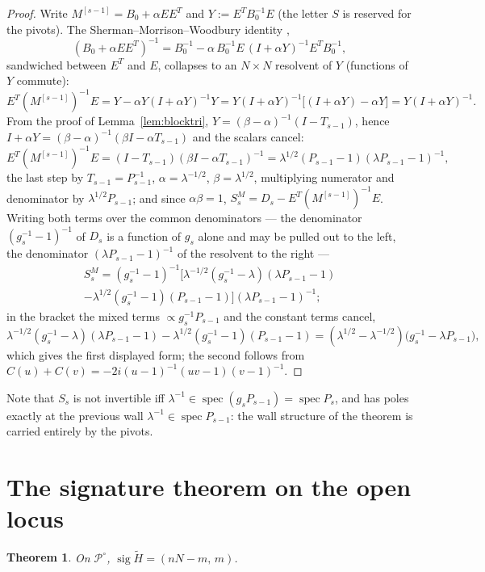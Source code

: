 \documentclass[11pt]{article}
\newtheorem{theorem}{Theorem}[section]
\theoremstyle{definition}
\newcommand{\Ht}{\widetilde H}
\begin{document}
\begin{proof}
Write $M^{[s-1]}=B_0+\alpha EE^{T}$ and $Y:=E^{T}B_0^{-1}E$ (the
letter $S$ is reserved for the pivots). The
Sherman--Morrison--Woodbury identity \cite{HJ},
\[
(B_0+\alpha EE^{T})^{-1}
=B_0^{-1}-\alpha\,B_0^{-1}E\,(I+\alpha Y)^{-1}E^{T}B_0^{-1},
\]
sandwiched between $E^{T}$ and $E$, collapses to an $N\times N$
resolvent of $Y$ (functions of $Y$ commute):
\[
E^{T}(M^{[s-1]})^{-1}E
=Y-\alpha Y(I+\alpha Y)^{-1}Y
=Y(I+\alpha Y)^{-1}\bigl[(I+\alpha Y)-\alpha Y\bigr]
=Y(I+\alpha Y)^{-1}.
\]
From the proof of Lemma~\ref{lem:blocktri},
$Y=(\beta-\alpha)^{-1}(I-T_{s-1})$, hence
$I+\alpha Y=(\beta-\alpha)^{-1}(\beta I-\alpha T_{s-1})$ and the
scalars cancel:
\[
E^{T}(M^{[s-1]})^{-1}E=(I-T_{s-1})(\beta I-\alpha T_{s-1})^{-1}
=\lambda^{1/2}(P_{s-1}-1)(\lambda P_{s-1}-1)^{-1},
\]
the last step by $T_{s-1}=P_{s-1}^{-1}$, $\alpha=\lambda^{-1/2}$,
$\beta=\lambda^{1/2}$, multiplying numerator and denominator by
$\lambda^{1/2}P_{s-1}$;
and since $\alpha\beta=1$, $S_s^{M}=D_s-E^{T}(M^{[s-1]})^{-1}E$.
Writing both terms over the common denominators --- the denominator
$(g_s^{-1}-1)^{-1}$ of $D_s$ is a function of $g_s$ alone and may be
pulled out to the left, the denominator $(\lambda P_{s-1}-1)^{-1}$
of the resolvent to the right ---
\begin{multline*}
S_s^{M}=(g_s^{-1}-1)^{-1}
\bigl[\lambda^{-1/2}(g_s^{-1}-\lambda)(\lambda P_{s-1}-1)\\
-\lambda^{1/2}(g_s^{-1}-1)(P_{s-1}-1)\bigr]
(\lambda P_{s-1}-1)^{-1};
\end{multline*}
in the bracket the mixed terms $\propto g_s^{-1}P_{s-1}$ and the
constant terms cancel,
\[
\lambda^{-1/2}(g_s^{-1}-\lambda)(\lambda P_{s-1}-1)
-\lambda^{1/2}(g_s^{-1}-1)(P_{s-1}-1)
=(\lambda^{1/2}-\lambda^{-1/2})\bigl(g_s^{-1}-\lambda P_{s-1}\bigr),
\]
which gives the first displayed form; the second follows from
$C(u)+C(v)=-2i(u-1)^{-1}(uv-1)(v-1)^{-1}$.

\end{proof}

Note that $S_s$ is not invertible iff
$\lambda^{-1}\in\operatorname{spec}(g_sP_{s-1})
=\operatorname{spec}P_s$, and has poles exactly at the previous wall
$\lambda^{-1}\in\operatorname{spec}P_{s-1}$: the wall structure of the
theorem is carried entirely by the pivots.

\section{The signature theorem on the open locus}\label{sec:open}
\begin{theorem}\label{thm:rankN}
On $\mathcal P^{\circ}$, $\operatorname{sig}\Ht=(nN-m,\,m)$.
\end{theorem}
\end{document}

